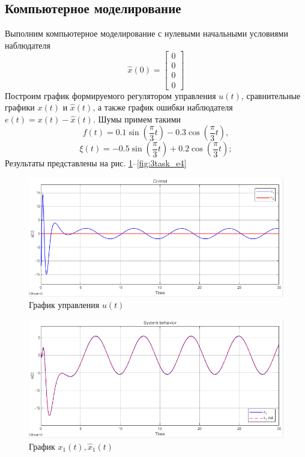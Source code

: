 \documentclass[a4paper, 12pt]{article}
\begin{document}
    \subsection{Компьютерное моделирование}
    Выполним компьютерное моделирование с нулевыми начальными условиями
    наблюдателя $$\hat{x}(0)=\begin{bmatrix}
        0\\ 0\\ 0\\ 0
    \end{bmatrix}$$ Построим график формируемого регулятором
    управления $u(t)$, сравнительные графики $x(t)$ и $\hat{x}(t)$,
    а также график ошибки наблюдателя $e(t) = x(t) -\hat{x}(t)$.
    Шумы примем такими
    $$
    f(t)=0.1\sin\left( \dfrac{\pi}{3}t \right)-0.3\cos\left( \dfrac{\pi}{3}t \right),
    $$
    $$
    \xi(t)=-0.5\sin\left( \dfrac{\pi}{3}t \right)+0.2\cos\left( \dfrac{\pi}{3}t \right);
    $$
    Результаты представлены на рис. \ref{fig:3task_u}--\ref{fig:3task_e4}
    \begin{figure}[H]
        \centering
        \includegraphics[scale=0.75]{3task_u.png}
        \captionsetup{skip=0pt}
        \caption{График управления $u(t)$}
        \label{fig:3task_u}
    \end{figure}
    \begin{figure}[H]
        \centering
        \includegraphics[scale=0.75]{3task_x1.png}
        \captionsetup{skip=0pt}
        \caption{График $x_1(t),\hat{x}_1(t)$}
        \label{fig:3task_x1}
    \end{figure}
\end{document}
